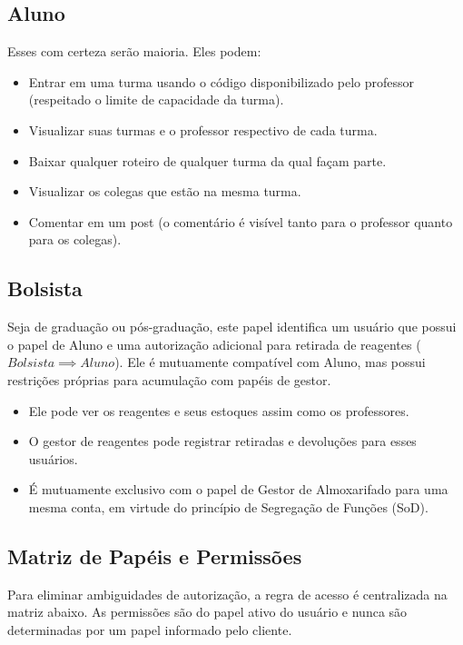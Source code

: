 \documentclass[12pt,a4paper]{article}
\begin{document}
\subsection{Aluno}
Esses com certeza serão maioria. Eles podem:
\begin{itemize}
    \item Entrar em uma turma usando o código disponibilizado pelo professor (respeitado o limite de capacidade da turma).
    \item Visualizar suas turmas e o professor respectivo de cada turma.
    \item Baixar qualquer roteiro de qualquer turma da qual façam parte.
    \item Visualizar os colegas que estão na mesma turma.
    \item Comentar em um post (o comentário é visível tanto para o professor quanto para os colegas).
\end{itemize}

\subsection{Bolsista}
Seja de graduação ou pós-graduação, este papel identifica um usuário que possui o papel de Aluno e uma autorização adicional para retirada de reagentes ($Bolsista \implies Aluno$). Ele é mutuamente compatível com Aluno, mas possui restrições próprias para acumulação com papéis de gestor.
\begin{itemize}
    \item Ele pode ver os reagentes e seus estoques assim como os professores.
    \item O gestor de reagentes pode registrar retiradas e devoluções para esses usuários.
    \item É mutuamente exclusivo com o papel de Gestor de Almoxarifado para uma mesma conta, em virtude do princípio de Segregação de Funções (SoD).
\end{itemize}

\subsection{Matriz de Papéis e Permissões}
Para eliminar ambiguidades de autorização, a regra de acesso é centralizada na matriz abaixo. As permissões são do papel ativo do usuário e nunca são determinadas por um papel informado pelo cliente.
\end{document}
